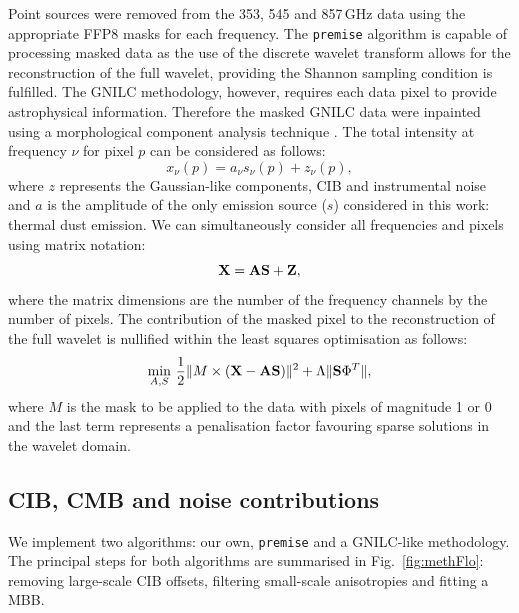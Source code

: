\documentclass[a4paper,fleqn,usenatbib]{mnras}
\begin{document}
Point sources were removed from the 353, 545 and 857\,GHz data using the appropriate FFP8 masks for each frequency. The {\texttt{premise}} algorithm is capable of processing masked data as the use of the discrete wavelet transform allows for the reconstruction of the full wavelet, providing the Shannon sampling condition is fulfilled. The GNILC methodology, however, requires each data pixel to provide astrophysical information. Therefore the masked GNILC data were inpainted using a morphological component analysis technique \citep{inpaint}. The total intensity at frequency $\nu$ for pixel $p$ can be considered as follows: 
\begin{equation}
x_{\nu}(p) = a_{\nu} s_{\nu}(p) + z_{\nu}(p),
\label{eq:basic}
\end{equation}
where $z$ represents the Gaussian-like components, CIB and instrumental noise and $a$ is the amplitude of the only emission source ($s$) considered in this work: thermal dust emission. We can simultaneously consider all frequencies and pixels using matrix notation: 
\begin{equation}
{\bf{X}} =  {\bf{A}} {\bf{S}} + {\bf{Z}},
\label{eq:basicmat}
\end{equation}
where the matrix dimensions are the number of the frequency channels by the number of pixels. The contribution of the masked pixel to the reconstruction of the full wavelet is nullified within the least squares optimisation as follows: 
\begin{equation}
\min_{A, S} \, \frac{1}{2} \| M \times ({\bf{X}} - {\bf{AS}})  \|^{2} + \Lambda \| {\bf{S}}  \Phi^{T}  \|, 
\end{equation}   
where $M$ is the mask to be applied to the data with pixels of magnitude 1 or 0 and the last term represents a penalisation factor favouring sparse solutions in the wavelet domain.   

\subsection{CIB, CMB and noise contributions} \label{cibcontrib}

We implement two algorithms: our own, {\texttt{premise}} and a GNILC-like methodology. The principal steps for both algorithms are summarised in Fig.~\ref{fig:methFlo}: removing large-scale CIB offsets, filtering small-scale anisotropies and fitting a MBB. 
\end{document}

